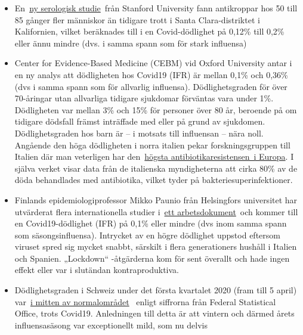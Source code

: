 \begin{itemize}
\tightlist
\item
  En~\href{https://www.medrxiv.org/content/10.1101/2020.04.14.20062463v1}{ny
  serologisk studie}~från Stanford University fann antikroppar hos 50
  till 85 gånger fler människor än tidigare trott i Santa
  Clara-distriktet i Kalifornien, vilket beräknades till i en
  Covid-dödlighet på 0,12\% till 0,2\% eller ännu mindre (dvs. i samma
  spann som för stark influensa)
\item
  Center for Evidence-Based Medicine (CEBM) vid Oxford University antar
  i en ny analys att dödligheten hos Covid19 (IFR) är mellan 0,1\% och
  0,36\% (dvs i samma spann som för allvarlig influensa).
  Dödlighetsgraden för över 70-åringar utan allvarliga tidigare
  sjukdomar förväntas vara under 1\%. Dödligheten var mellan 3\% och
  15\% för personer över 80 år, beroende på om tidigare dödsfall främst
  inträffade med eller på grund av sjukdomen. Dödlighetsgraden hos barn
  är -- i motsats till influensan -- nära noll. Angående den höga
  dödligheten i norra italien pekar forskningsgruppen till Italien där
  man veterligen har
  den~\href{https://www.ansa.it/english/news/science_tecnology/2019/11/19/italy-top-in-eu-in-antibiotic-resistance_369e0123-0107-445e-8c17-f11932c9d27c.html}{högsta
  antibiotikaresistensen~i Europa}. I själva verket visar data från de
  italienska myndigheterna att cirka 80\% av de döda behandlades med
  antibiotika, vilket tyder på bakteriesuperinfektioner.
\item
  Finlands epidemiologiprofessor Mikko Paunio från Helsingfors
  universitet har utvärderat flera internationella studier
  i~\href{https://lockdownsceptics.org/wp-content/uploads/2020/04/How-the-World-got-Fooled-by-COVID-ed-2c.pdf}{ett
  arbetsdokument}~och kommer till en Covid19-dödlighet (IFR) på 0,1\%
  eller mindre (dvs inom samma spann som säsongsinfluensa). Intrycket av
  en högre dödlighet uppstod eftersom viruset spred sig mycket snabbt,
  särskilt i flera generationers hushåll i Italien och Spanien.
  „Lockdown`` -åtgärderna kom för sent överallt och hade ingen effekt
  eller var i slutändan kontraproduktiva.
\item
  Dödlighetsgraden i Schweiz under det första kvartalet 2020 (fram till
  5 april)
  var~\href{https://swprs.files.wordpress.com/2020/04/ch-mortalitaet-q1-2020.pdf}{i
  mitten av normalområdet}~ enligt siffrorna från Federal Statistical
  Office, trots Covid19. Anledningen till detta är att vintern och
  därmed årets influensasäsong var exceptionellt mild, som nu delvis

\end{itemize}
